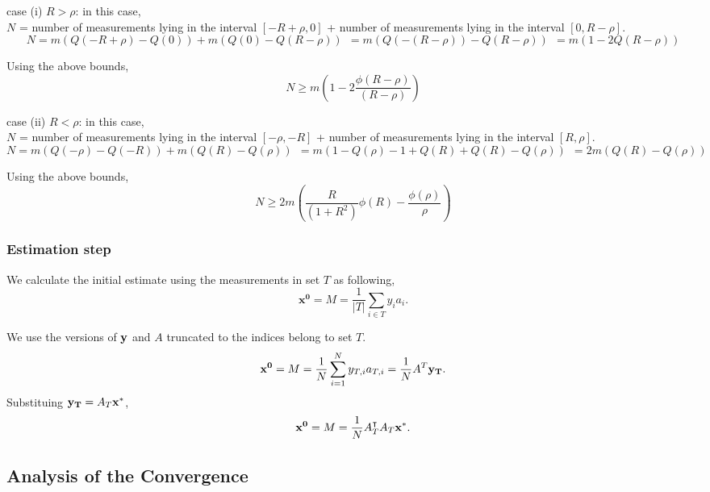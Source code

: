 case (i) $R > \rho$: in this case, \\
$N$ = number of measurements lying in the interval $[-R + \rho,0]$ + number of measurements lying in the interval $[0, R-\rho]$.
\begin{equation}
N = m\left(Q(-R+\rho)- Q(0)\right) + m\left(Q(0)- Q(R-\rho)\right)
~~ = m\left(Q(-(R-\rho))- Q(R-\rho)\right) 
~~ = m\left(1-2Q(R-\rho)\right)
\end{equation}

Using the above bounds,
$$
N \geq m \left(1-2\frac{\phi(R-\rho)}{(R-\rho)} \right)
$$

case (ii) $R < \rho$: in this case, \\
$N$ = number of measurements lying in the interval $[-\rho,-R]$ + number of measurements lying in the interval $[R,\rho]$.
\begin{equation}
N = m\left(Q(-\rho)- Q(-R)\right) + m\left(Q(R)- Q(\rho)\right)
~~ = m\left(1 - Q(\rho)-1 +Q(R) +Q(R) -Q(\rho)\right) 
~~ = 2m\left(Q(R)-Q(\rho)\right)
\end{equation}

Using the above bounds,
$$
N \geq 2m \left(\frac{R}{(1+R^2)} \phi(R) - \frac{\phi(\rho)}{\rho}\right)
$$


\subsubsection{Estimation step}

We calculate the initial estimate using the measurements in set $T$ as following,
$$
\mathbf{{x}^0} = M = \frac{1}{|T|}\sum_{i\in T}y_{i}a_{i}.
$$

We use the versions of $\mathbf{y}$ and $A$ truncated to the indices belong to set $T$.
$$
\mathbf{{x}^0} = M = \frac{1}{N}\sum_{i=1}^{N}y_{T,i}a_{T,i} =  \frac{1}{N}A^T\mathbf{y_T}.
$$
Substituing $\mathbf{y_T}=A_T\mathbf{x^*}$,
$$
\mathbf{{x}^0} = M = \frac{1}{N}A_T^\intercal A_T\mathbf{x^*}.
$$
\subsection{Analysis of the Convergence}
